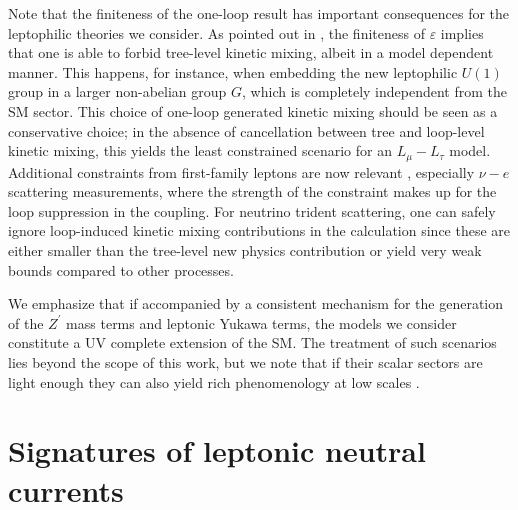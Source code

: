 Note that the finiteness of the one-loop result has important consequences for the leptophilic theories we consider. As pointed out in , the finiteness of $\varepsilon$ implies that one is able to forbid tree-level kinetic mixing, albeit in a model dependent manner. This happens, for instance, when embedding the new leptophilic $U(1)$ group in a larger non-abelian group $G$, which is completely independent from the SM sector. This choice of one-loop generated kinetic mixing should be seen as a conservative choice; in the absence of cancellation between tree and loop-level kinetic mixing, this yields the least constrained scenario for an $L_\mu-L_\tau$ model. Additional constraints from first-family leptons are now relevant \cite{Kamada:2015era,Araki:2015mya}, especially $\nu-e$ scattering measurements, where the strength of the constraint makes up for the loop suppression in the coupling. For neutrino trident scattering, one can safely ignore loop-induced kinetic mixing contributions in the calculation since these are either smaller than the tree-level new physics contribution or yield very weak bounds compared to other processes. 

We emphasize that if accompanied by a consistent mechanism for the generation of the $Z^\prime$ mass terms and leptonic Yukawa terms, the models we consider constitute a UV complete extension of the SM. The treatment of such scenarios lies beyond the scope of this work, but we note that if their scalar sectors are light enough they can also yield rich phenomenology at low scales \cite{Heeck:2011wj}.

\section{\label{sec:signatures}Signatures of leptonic neutral currents}

